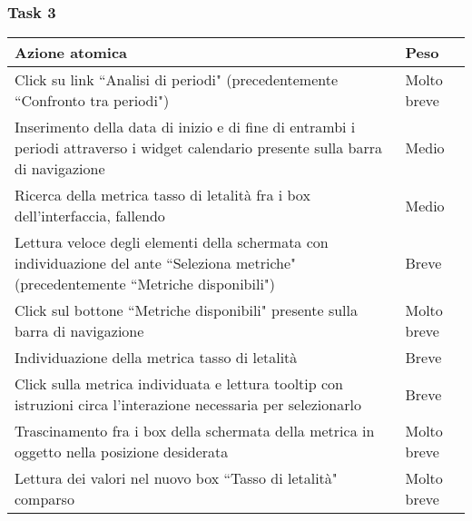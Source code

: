 \subsubsection{Task 3}
\label{sss:iaa-task-3}

{
\renewcommand{\arraystretch}{2}
\begin{longtable}[h]{| p{14cm} | p{2.5cm} |}
    \hline
    \textbf{Azione atomica} & \textbf{Peso} \\
    \hline
    \endhead
    Click su link ``Analisi di periodi" (precedentemente ``Confronto tra periodi") & Molto breve \\
    \hline
    Inserimento della data di inizio e di fine di entrambi i periodi attraverso i widget calendario presente sulla barra di navigazione & Medio \\
    \hline
    Ricerca della metrica tasso di letalità fra i box dell'interfaccia, fallendo & Medio \\
    \hline
    Lettura veloce degli elementi della schermata con individuazione del ante ``Seleziona metriche" (precedentemente ``Metriche disponibili") & Breve \\
    \hline
    Click sul bottone ``Metriche disponibili" presente sulla barra di navigazione & Molto breve \\
    \hline
    Individuazione della metrica tasso di letalità & Breve \\
    \hline
    Click sulla metrica individuata e lettura tooltip con istruzioni circa l'interazione necessaria per selezionarlo & Breve \\
    \hline
    Trascinamento fra i box della schermata della metrica in oggetto nella posizione desiderata & Molto breve \\
    \hline
    Lettura dei valori nel nuovo box ``Tasso di letalità" comparso & Molto breve \\
    \hline
\end{longtable}
}
